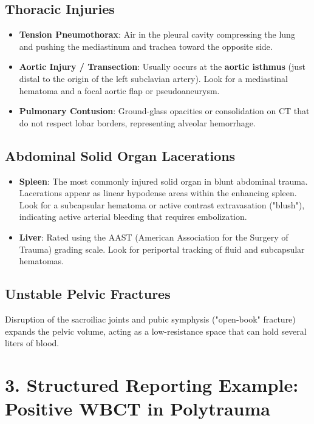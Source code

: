 \subsection*{Thoracic Injuries}
\begin{itemize}
    \item \textbf{Tension Pneumothorax}: Air in the pleural cavity compressing the lung and pushing the mediastinum and trachea toward the opposite side.
    \item \textbf{Aortic Injury / Transection}: Usually occurs at the \textbf{aortic isthmus} (just distal to the origin of the left subclavian artery). Look for a mediastinal hematoma and a focal aortic flap or pseudoaneurysm.
    \item \textbf{Pulmonary Contusion}: Ground-glass opacities or consolidation on CT that do not respect lobar borders, representing alveolar hemorrhage.
\end{itemize}

\subsection*{Abdominal Solid Organ Lacerations}
\begin{itemize}
    \item \textbf{Spleen}: The most commonly injured solid organ in blunt abdominal trauma. Lacerations appear as linear hypodense areas within the enhancing spleen. Look for a subcapsular hematoma or active contrast extravasation ("blush"), indicating active arterial bleeding that requires embolization.
    \item \textbf{Liver}: Rated using the AAST (American Association for the Surgery of Trauma) grading scale. Look for periportal tracking of fluid and subcapsular hematomas.
\end{itemize}

\subsection*{Unstable Pelvic Fractures}
Disruption of the sacroiliac joints and pubic symphysis ("open-book" fracture) expands the pelvic volume, acting as a low-resistance space that can hold several liters of blood.


\section*{3. Structured Reporting Example: Positive WBCT in Polytrauma}

